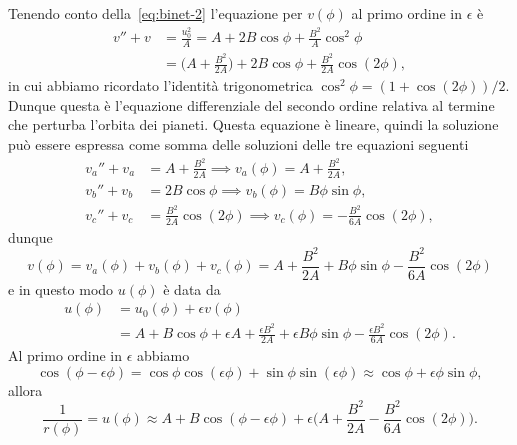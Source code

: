 Tenendo conto della~\eqref{eq:binet-2} l'equazione per $v(\phi)$ al primo ordine
in $\epsilon$ è
\begin{equation}
  \begin{split}
    v'' + v &= \frac{u_{0}^{2}}{A} = A + 2B\cos\phi +
    \frac{B^{2}}{A}\cos^{2}\phi \\
    &= \bigg(A + \frac{B^{2}}{2A}\bigg) + 2B\cos\phi +
    \frac{B^{2}}{2A}\cos(2\phi),
\end{split}
\end{equation}
in cui abbiamo ricordato l'identità trigonometrica
$\cos^{2}\phi = (1 + \cos(2\phi))/2$.  Dunque questa è l'equazione differenziale
del secondo ordine relativa al termine che perturba l'orbita dei pianeti.
Questa equazione è lineare, quindi la soluzione può essere espressa come somma
delle soluzioni delle tre equazioni seguenti
\begin{subequations}
  \begin{align}
    v_{a}'' + v_{a} &= A + \frac{B^{2}}{2A} \implies v_{a}(\phi) = A +
    \frac{B^{2}}{2A}, \\
    v_{b}'' + v_{b} &= 2B\cos\phi \implies v_{b}(\phi) = B\phi \sin\phi, \\
    v_{c}'' + v_{c} &= \frac{B^{2}}{2A}\cos(2\phi) \implies v_{c}(\phi) =
    -\frac{B^{2}}{6A}\cos(2\phi),
  \end{align}
\end{subequations}
dunque
\begin{equation}
  v(\phi) = v_{a}(\phi) + v_{b}(\phi) + v_{c}(\phi) = A + \frac{B^{2}}{2A} +
  B\phi\sin\phi - \frac{B^{2}}{6A}\cos(2\phi)
\end{equation}
e in questo modo $u(\phi)$ è data da
\begin{equation}
  \begin{split}
    u(\phi) &= u_{0}(\phi) + \epsilon v(\phi) \\
    &= A + B\cos\phi + \epsilon A + \frac{\epsilon B^{2}}{2A} + \epsilon
    B\phi\sin\phi - \frac{\epsilon B^{2}}{6A}\cos(2\phi).
  \end{split}
\end{equation}
Al primo ordine in $\epsilon$ abbiamo
\begin{equation}
  \cos(\phi - \epsilon\phi) = \cos\phi \cos(\epsilon\phi) + \sin\phi
  \sin(\epsilon\phi) \approx \cos\phi + \epsilon\phi\sin\phi,
\end{equation}
allora
\begin{equation}
  \frac{1}{r(\phi)} = u(\phi) \approx A + B\cos(\phi - \epsilon\phi) +
  \epsilon\bigg(A + \frac{B^{2}}{2A} - \frac{B^{2}}{6A}\cos(2\phi)\bigg).
\end{equation}
